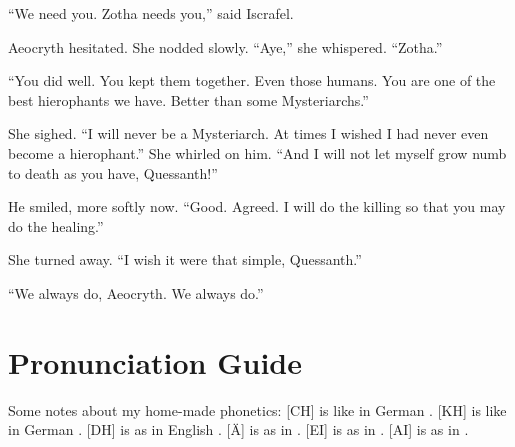 \documentclass
  [a4paper,
   12pt,
   oneside
  ]%
  {article}
\begin{document}
``We need you. Zotha needs you,'' said Iscrafel.

Aeocryth hesitated. She nodded slowly. ``Aye,'' she whispered. ``Zotha.''

``You did well. You kept them together. Even those humans. You are one of the best hierophants we have. Better than some Mysteriarchs.''

She sighed. 
``I will never be a Mysteriarch. At times I wished I had never even become a hierophant.'' 
She whirled on him. 
``And I will not let myself grow numb to death as you have, Quessanth!'' 

He smiled, more softly now. ``Good. Agreed. I will do the killing so that you may do the healing.''

She turned away. ``I wish it were that simple, Quessanth.''

``We always do, Aeocryth. We always do.''








\newpage
\appendix
\section{Pronunciation Guide}
Some notes about my home-made phonetics: 
[CH] is like in German . 
[KH] is like in German . 
[DH] is as in English . 
[Ä] is as in .
[EI] is as in .
[AI] is as in .    

\begin{pronunciationenvironment}{
}
\end{pronunciationenvironment}
\end{document}
